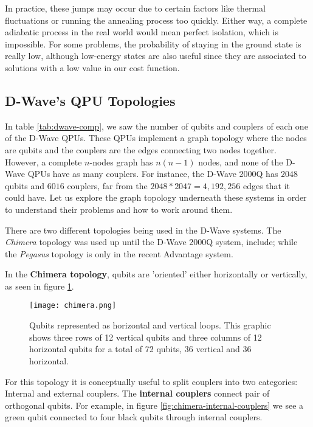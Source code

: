 In practice, these jumps may occur due to certain factors like thermal fluctuations or running the annealing process too quickly. Either way, a complete adiabatic process in the real world would mean perfect isolation, which is impossible. For some problems, the probability of staying in the ground state is really low, although low-energy states are also useful since they are associated to solutions with a low value in our cost function.


\subsection{D-Wave's QPU Topologies}
\label{sec:topologies}


In table \ref{tab:dwave-comp}, we saw the number of qubits and couplers of each one of the D-Wave QPUs. These QPUs implement a graph topology where the nodes are qubits and the couplers are the edges connecting two nodes together. However, a complete $n$-nodes graph has $n(n-1)$ nodes, and none of the D-Wave QPUs have as many couplers. For instance, the D-Wave 2000Q has $2048$ qubits and $6016$ couplers, far from the $2048 * 2047 = 4,192,256$ edges that it could have. Let us explore the graph topology underneath these systems in order to understand their problems and how to work around them.

There are two different topologies being used in the D-Wave systems. The \emph{Chimera} topology was used up until the D-Wave 2000Q system, include; while the \emph{Pegasus} topology is only in the recent Advantage system. 

In the \textbf{Chimera topology}, qubits are 'oriented' either horizontally or vertically, as seen in figure \ref{fig:chimera}.

\begin{figure}[h]
	\texttt{[image: chimera.png]}
	\centering
	\caption{Qubits represented as horizontal and vertical loops. This graphic shows three rows of 12 vertical qubits and three columns of 12 horizontal qubits for a total of 72 qubits, 36 vertical and 36 horizontal. \cite{DWaveDoc-Architecture}}
	\label{fig:chimera}
\end{figure}

For this topology it is conceptually useful to split couplers into two categories: Internal and external couplers. The \textbf{internal couplers} connect pair of orthogonal qubits. For example, in figure \ref{fig:chimera-internal-couplers} we see a green qubit connected to four black qubits through internal couplers.

